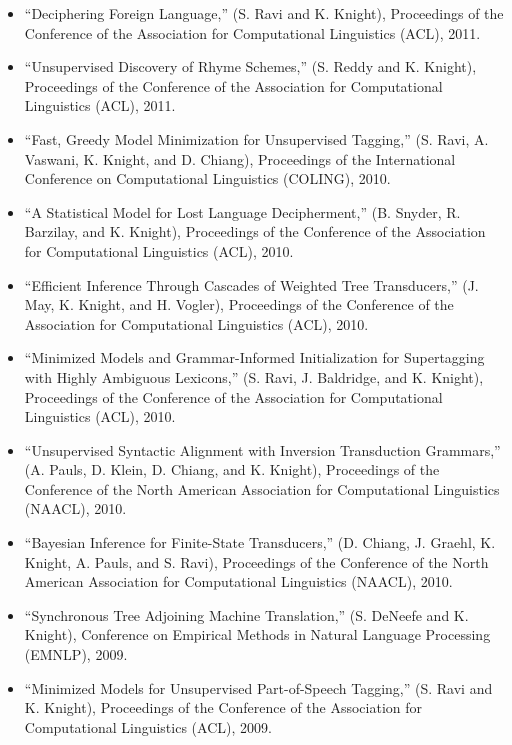 \begin{itemize}
\item ``Deciphering Foreign Language,''
(S. Ravi and K. Knight),
Proceedings of the Conference of the 
Association for Computational Linguistics (ACL), 2011.

\item ``Unsupervised Discovery of Rhyme Schemes,''
(S. Reddy and K. Knight),
Proceedings of the Conference of the 
Association for Computational Linguistics (ACL), 2011.

\item ``Fast, Greedy Model Minimization for Unsupervised Tagging,''
(S. Ravi, A. Vaswani, K. Knight, and D. Chiang),
Proceedings of the International Conference on Computational
Linguistics (COLING), 2010.

\item ``A Statistical Model for Lost Language Decipherment,'' 
(B. Snyder, R. Barzilay, and K. Knight), 
Proceedings of the Conference of the 
Association for Computational Linguistics (ACL), 
2010.

\item ``Efficient Inference Through Cascades of Weighted
Tree Transducers,'' (J. May, K. Knight, and H. Vogler), 
Proceedings of the Conference of the 
Association for Computational Linguistics (ACL), 
2010.

\item ``Minimized Models and Grammar-Informed Initialization
for Supertagging with Highly Ambiguous Lexicons,''
(S. Ravi, J. Baldridge, and K. Knight), 
Proceedings of the Conference of the 
Association for Computational Linguistics (ACL), 
2010.

\item ``Unsupervised Syntactic Alignment with Inversion Transduction
Grammars,'' (A. Pauls, D. Klein, D. Chiang, and K. Knight),
Proceedings of the Conference of the 
North American Association for Computational Linguistics (NAACL), 
2010.

\item ``Bayesian Inference for Finite-State Transducers,'' 
(D. Chiang, J. Graehl, K. Knight, A. Pauls, and S. Ravi),
Proceedings of the Conference of the 
North American Association for Computational Linguistics (NAACL), 
2010.


\item ``Synchronous Tree Adjoining Machine Translation,''
(S. DeNeefe and K. Knight), 
Conference on Empirical Methods in Natural Language Processing (EMNLP), 
2009.

\item ``Minimized Models for Unsupervised Part-of-Speech Tagging,''
(S. Ravi and K. Knight), 
Proceedings of the Conference of the 
Association for Computational Linguistics (ACL), 
2009.


\end{itemize}
